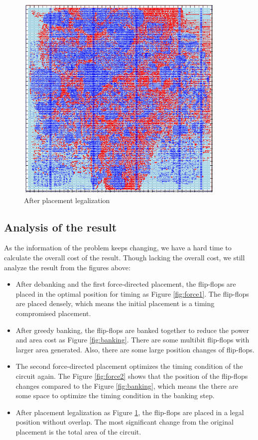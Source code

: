 \documentclass[12pt]{article}
\begin{document}
\begin{figure}[htbp]
    \centering
    \includegraphics[width=0.9\textwidth]{results/legal.png}
    \caption{After placement legalization}
    \label{fig:legal}
\end{figure}

\FloatBarrier

\subsection{Analysis of the result}

As the information of the problem keeps changing, we have a hard time to calculate the overall cost of the result. Though lacking the overall cost, we still analyze the result from the figures above:

\begin{itemize}
    \item After debanking and the first force-directed placement, the flip-flops are placed in the optimal position for timing as Figure \ref{fig:force1}. The flip-flops are placed densely, which means the initial placement is a timing compromised placement.
    \item After greedy banking, the flip-flops are banked together to reduce the power and area cost as Figure \ref{fig:banking}. There are some multibit flip-flops with larger area generated. Also, there are some large position changes of flip-flops.
    \item The second force-directed placement optimizes the timing condition of the circuit again. The Figure \ref{fig:force2} shows that the position of the flip-flops changes compared to the Figure \ref{fig:banking}, which means the there are some space to optimize the timing condition in the banking step.
    \item After placement legalization as Figure \ref{fig:legal}, the flip-flops are placed in a legal position without overlap. The most significant change from the original placement is the total area of the circuit.
\end{itemize}
\end{document}
